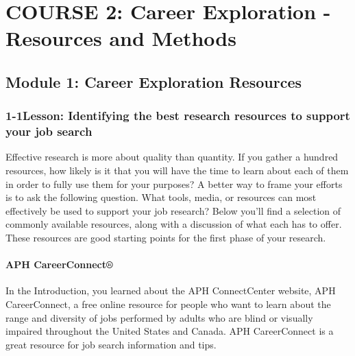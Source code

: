 \hypertarget{course2}{}\chapter*{COURSE 2: Career Exploration - Resources and Methods}\label{course2}
\noindent\makebox[\linewidth]{\rule{\linewidth}{0.4pt}}
\localtableofcontents
\noindent\makebox[\textwidth]{\rule{\linewidth}{0.4pt}}
\newpage
\pagebreak \section*{Module 1: Career Exploration Resources}
\noindent\makebox[\textwidth]{\rule{\linewidth}{0.4pt}} 
\localtableofcontents
\noindent\makebox[\textwidth]{\rule{\linewidth}{0.4pt}}
\leftskip=0.5cm

\pagebreak \subsection*{1-1\quad Lesson: Identifying the best research resources to support your job search}
Effective research is more about quality than quantity. If you gather a hundred resources, how likely is it that you will have the time to learn about each of them in order to fully use them for your purposes? A better way to frame your efforts is to ask the following question. What tools, media, or resources can most effectively be used to support your job research? Below you'll find a selection of commonly available resources, along with a discussion of what each has to offer. These resources are good starting points for the first phase of your research.
\subsubsection*{APH CareerConnect®}
In the Introduction, you learned about the APH ConnectCenter website, APH CareerConnect, a free online resource for people who want to learn about the range and diversity of jobs performed by adults who are blind or visually impaired throughout the United States and Canada. APH CareerConnect is a great resource for job search information and tips.
